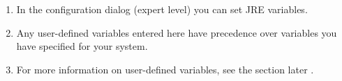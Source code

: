 





\begin{enumerate}
\item In the \gdaut{} configuration dialog (expert level)  you can set JRE variables.
\item Any user-defined variables entered here have precedence over variables you have specified for your system. 
\item For more information on user-defined variables, see the section later . 
\end{enumerate}
